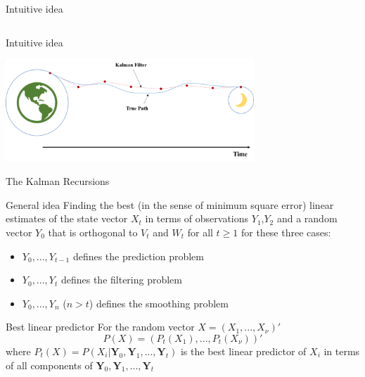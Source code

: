 \documentclass[11pt]{beamer}
\begin{document}
\begin{frame}{Intuitive idea \cite{pml2Book}}
\begin{columns}
\begin{column}{0.5\textwidth}
\begin{center}
     \end{center}
\end{column}
\end{columns}
\end{frame}


\begin{frame}{Intuitive idea \cite{kl}}
    \begin{center}
     \includegraphics[width=0.7\textwidth]{Pic/Kalman_example.png}
     \end{center}
\end{frame}



\begin{frame}{The Kalman Recursions \cite{brockwell2002introduction}}
\small
\begin{alertblock}{General idea }
Finding the best (in the sense of minimum square error) linear estimates of the state vector $X_{t}$ in terms of observations $Y_{1}$,$Y_{2}$ and a random vector $Y_{0}$ that is orthogonal to $V_{t}$ and $W_{t}$ for all $t\geq 1$ for these three cases: 
\begin{itemize}
\item $Y_{0},...,Y_{t-1}$ defines the prediction problem
\item $Y_{0},...,Y_{t}$ defines the filtering problem
\item $Y_{0},...,Y_{n}$ ($n > t$) defines the smoothing problem 
\end{itemize}
\end{alertblock}
\begin{alertblock}{Best linear predictor}
For the random vector $X=(X_{1},...,X_{\nu})'$ 
\begin{equation*}
P(X)=(P_{t}(X_{1}),...,P_{t}(X_{\nu}))'
\end{equation*}
where $P_{t}(X)=P(X_{i}|\bm{Y}_{0},\bm{Y}_{1},...,\bm{Y}_{t})$  is the best linear predictor of $X_{i}$ in terms of all components of $\bm{Y}_{0},\bm{Y}_{1},...,\bm{Y}_{t}$
\end{alertblock}
\end{frame}
\end{document}
